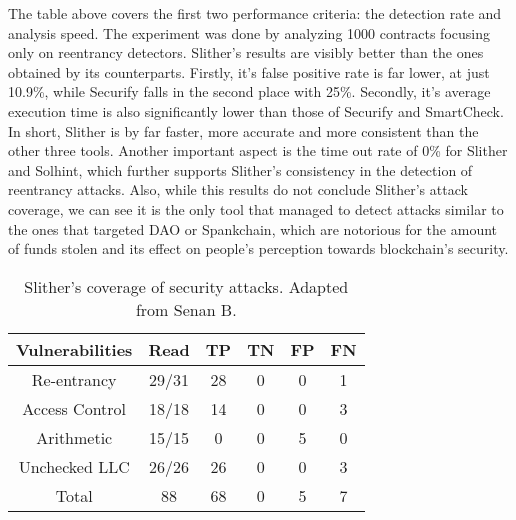 The table above covers the first two performance criteria: the detection rate and analysis speed. The experiment was done by analyzing 1000 contracts focusing only on reentrancy detectors. Slither's results are visibly better than the ones obtained by its counterparts. Firstly, it's false positive rate is far lower, at just 10.9\%, while Securify falls in the second place with 25\%. Secondly, it's average execution time is also significantly lower than those of Securify and SmartCheck. In short, Slither is by far faster, more accurate and more consistent than the other three tools. Another important aspect is the time out rate of 0\% for Slither and Solhint, which further supports Slither's consistency in the detection of reentrancy attacks. Also, while this results do not conclude Slither's attack coverage, we can see it is the only tool that managed to detect attacks similar to the ones that targeted DAO or Spankchain, which are notorious for the amount of funds stolen and its effect on people's perception towards blockchain's security.

\begin{table}[h]
\centering
\begin{tabular}{|cccccc|}
\hline
\multicolumn{1}{|c|}{Vulnerabilities} & \multicolumn{1}{c|}{Read} & \multicolumn{1}{c|}{TP} & \multicolumn{1}{c|}{TN} & \multicolumn{1}{c|}{FP} & FN \\ \hline
\multicolumn{1}{|c|}{Re-entrancy}     & 29/31                     & 28                      & 0                       & 0                       & 1  \\
\multicolumn{1}{|c|}{Access Control}  & 18/18                     & 14                      & 0                       & 0                       & 3  \\
\multicolumn{1}{|c|}{Arithmetic}      & 15/15                     & 0                       & 0                       & 5                       & 0  \\
\multicolumn{1}{|c|}{Unchecked LLC}   & 26/26                     & 26                      & 0                       & 0                       & 3  \\ \hline
Total                                 & 88                        & 68                      & 0                       & 5                       & 7  \\ \hline
\end{tabular}
\caption{Slither's coverage of security attacks. Adapted from Senan B. \cite{staticAnalysisTest}}
\label{tab:my-table1}
\end{table}

